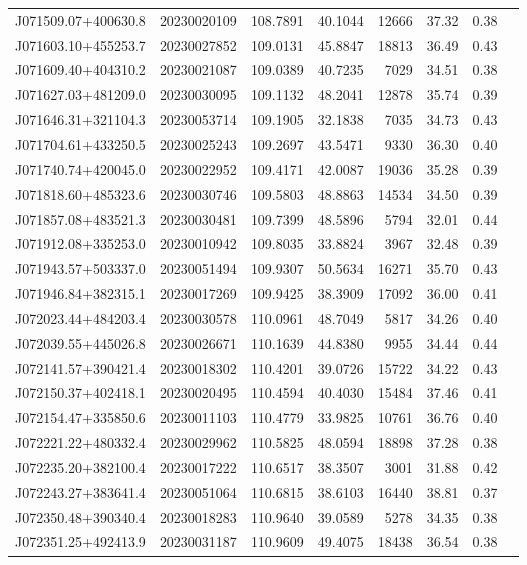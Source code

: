 \documentclass{article}
\begin{document}
\begin {longtable}{|l|l|r|r|r|r|r|l|}
 J071509.07+400630.8&  20230020109&  108.7891&   40.1044& 12666& 37.32& 0.38&\\
 J071603.10+455253.7&  20230027852&  109.0131&   45.8847& 18813& 36.49& 0.43&\\
 J071609.40+404310.2&  20230021087&  109.0389&   40.7235&  7029& 34.51& 0.38&\\
 J071627.03+481209.0&  20230030095&  109.1132&   48.2041& 12878& 35.74& 0.39&\\
 J071646.31+321104.3&  20230053714&  109.1905&   32.1838&  7035& 34.73& 0.43&\\
 J071704.61+433250.5&  20230025243&  109.2697&   43.5471&  9330& 36.30& 0.40&\\
 J071740.74+420045.0&  20230022952&  109.4171&   42.0087& 19036& 35.28& 0.39&\\
 J071818.60+485323.6&  20230030746&  109.5803&   48.8863& 14534& 34.50& 0.39&\\
 J071857.08+483521.3&  20230030481&  109.7399&   48.5896&  5794& 32.01& 0.44&\\
 J071912.08+335253.0&  20230010942&  109.8035&   33.8824&  3967& 32.48& 0.39&\\
 J071943.57+503337.0&  20230051494&  109.9307&   50.5634& 16271& 35.70& 0.43&\\
 J071946.84+382315.1&  20230017269&  109.9425&   38.3909& 17092& 36.00& 0.41&\\
 J072023.44+484203.4&  20230030578&  110.0961&   48.7049&  5817& 34.26& 0.40&\\
 J072039.55+445026.8&  20230026671&  110.1639&   44.8380&  9955& 34.44& 0.44&\\
 J072141.57+390421.4&  20230018302&  110.4201&   39.0726& 15722& 34.22& 0.43&\\
 J072150.37+402418.1&  20230020495&  110.4594&   40.4030& 15484& 37.46& 0.41&\\
 J072154.47+335850.6&  20230011103&  110.4779&   33.9825& 10761& 36.76& 0.40&\\
 J072221.22+480332.4&  20230029962&  110.5825&   48.0594& 18898& 37.28& 0.38&\\
 J072235.20+382100.4&  20230017222&  110.6517&   38.3507&  3001& 31.88& 0.42&\\
 J072243.27+383641.4&  20230051064&  110.6815&   38.6103& 16440& 38.81& 0.37&\\
 J072350.48+390340.4&  20230018283&  110.9640&   39.0589&  5278& 34.35& 0.38&\\
 J072351.25+492413.9&  20230031187&  110.9609&   49.4075& 18438& 36.54& 0.38&\\

\end{longtable}
\end{document}

